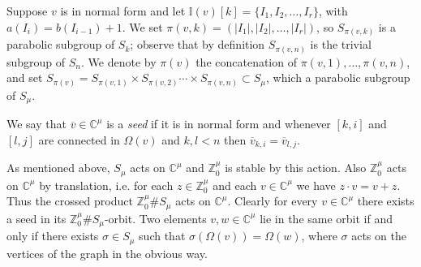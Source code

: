 \documentclass[11pt,fleqn]{amsart}
\newcounter{para}[section]
\newcommand\CC{\mathbb C}
\newcommand\ZZ{\mathbb Z}
\newcommand\vv{\overline{v}}
\newcommand\II{\mathbb I}
\newcommand\abs[1]{|#1|}
\begin{document}
Suppose $v$ is in normal form and let $\II(v)[k] = \{I_1, I_2, \ldots, I_r\}$, 
with $a(I_i) = b(I_{i-1}) + 1$. We set $\pi(v,k) = (\abs{I_1},\abs{I_2}, 
\ldots, \abs{I_r})$, so $S_{\pi(v,k)}$ is a parabolic subgroup of $S_k$; 
observe that by definition $S_{\pi(v,n)}$ is the trivial subgroup of $S_n$. 
We denote by $\pi(v)$ the concatenation of $\pi(v,1), \ldots, \pi(v,n)$, and 
set $S_{\pi(v)} = S_{\pi(v,1)} \times S_{\pi(v,2)} \cdots 
\times S_{\pi(v,n)} \subset S_\mu$, which a parabolic subgroup of $S_\mu$.
\begin{Definition}
We say that $\vv \in \CC^\mu$ is a \emph{seed} if it is in normal form and 
whenever $[k,i]$ and $[l,j]$ are connected in $\Omega(v)$ and $k,l < n$ then
$\vv_{k,i} = \vv_{l,j}$.
\end{Definition}
As mentioned above, $S_\mu$ acts on $\CC^\mu$ and $\ZZ_0^\mu$ is stable by
this action. Also $\ZZ_0^\mu$ acts on $\CC^\mu$ by translation, i.e. for each
$z \in \ZZ_0^\mu$ and each $v \in \CC^\mu$ we have $z \cdot v = v + z$. Thus 
the crossed product $\ZZ_0^\mu \# S_\mu$ acts on $\CC^\mu$. Clearly for every
$v \in \CC^\mu$ there exists a seed in its $\ZZ_0^\mu \# S_\mu$-orbit. Two 
elements $v,w \in \CC^\mu$ lie in the same orbit if and only if there exists
$\sigma \in S_\mu$ such that $\sigma(\Omega(v)) = \Omega(w)$, where $\sigma$
acts on the vertices of the graph in the obvious way.
\end{document}
